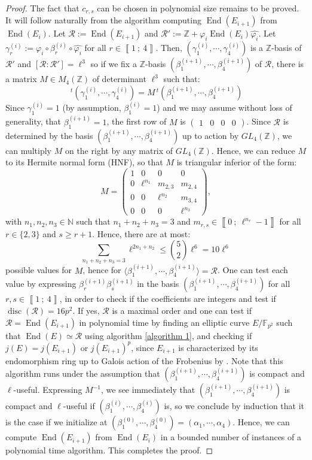 \documentclass[a4paper,10pt]{report}
\theoremstyle{definition}
\theoremstyle{plain}
\theoremstyle{definition}
\newcommand{\N}{\mathbb{N}}
\newcommand{\Z}{\mathbb{Z}}
\newcommand{\F}{\mathbb{F}}
\newcommand{\m}[1]{\mathcal{#1}}
\renewcommand{\i}[2]{\left\llbracket #1~;~#2\right\rrbracket}
\renewcommand{\(}{\left(}
\renewcommand{\)}{\right)}
\DeclareMathOperator{\End}{End}
\DeclareMathOperator{\disc}{disc}
\begin{document}
\begin{proof}
The fact that $c_{r,s}$ can be chosen in polynomial size remains to be proved. It will follow naturally from the algorithm computing $\End(E_{i+1})$ from $\End(E_i)$. Let $\m{R}:=\End(E_{i+1})$ and $\m{R}':=\Z+\varphi_i\End(E_i)\widehat{\varphi_i}$.  Let $\gamma_r^{(i)}:=\varphi_i\circ\beta_r^{(i)}\circ\widehat{\varphi_i}$ for all $r\in\i{1}{4}$. Then, $(\gamma_1^{(i)},\cdots, \gamma_4^{(i)})$ is a $\Z$-basis of $\m{R}'$ and $[\m{R}:\m{R}']=\ell^3$ so if we fix a $\Z$-basis $(\beta_1^{(i+1)},\cdots, \beta_4^{(i+1)})$ of $\m{R}$, there is a matrix $M\in M_4(\Z)$ of determinant $\ell^3$ such that:
\[\,^t (\gamma_1^{(i)},\cdots, \gamma_4^{(i)})=M \,^t(\beta_1^{(i+1)},\cdots, \beta_4^{(i+1)})\]
Since $\gamma_1^{(i)}=1$ (by assumption, $\beta_1^{(i)}=1$) and we may assume without loss of generality, that $\beta_1^{(i+1)}=1$, the first row of $M$ is $(\begin{array}{cccc}
1 & 0 & 0 & 0
\end{array})$.  Since $\m{R}$ is determined by the basis $(\beta_1^{(i+1)},\cdots, \beta_4^{(i+1)})$ up to action by $GL_4(\Z)$, we can multiply $M$ on the right by any matrix of $GL_4(\Z)$. Hence, we can reduce $M$ to its Hermite normal form (HNF), so that $M$ is triangular inferior of the form:
\[M=\(\begin{array}{cccc}
1 & 0 & 0 & 0\\
0 & \ell^{n_1} & m_{2,3} & m_{2,4}\\
0 & 0 & \ell^{n_2} & m_{3,4} \\
0 & 0 & 0 & \ell^{n_3}
\end{array}\),\]
with $n_1,n_2,n_3\in\N$ such that $n_1+n_2+n_3=3$ and $m_{r,s}\in\i{0}{\ell^{n_r}-1}$ for all $r\in\{2,3\}$ and $s\geq r+1$. Hence, there are at most:
\[\sum_{n_1+n_2+n_3=3} \ell^{2n_1+n_2}\leq \binom{5}{2}\ell^{6}=10\ell^6\]
possible values for $M$, hence for $\langle\beta_1^{(i+1)},\cdots, \beta_4^{(i+1)}\rangle=\m{R}$. One can test each value by expressing $\beta_r^{(i+1)}\beta_s^{(i+1)}$ in the basis $(\beta_1^{(i+1)},\cdots, \beta_4^{(i+1)})$ for all $r,s\in\i{1}{4}$, in order to check if the coefficients are integers and test if $\disc(\m{R})=16p^2$.  If yes, $\m{R}$ is a maximal order and one can test if $\m{R}=\End(E_{i+1})$ in polynomial time by finding an elliptic curve $E/\F_{p^2}$ such that $\End(E)\simeq\m{R}$ using algorithm \ref{algorithm 1}, and checking if $j(E)=j(E_{i+1})$ or $j(E_{i+1})^p$, since $E_{i+1}$ is characterized by its endomorphism ring up to Galois action of the Frobenius by \cite[Lemma 42.4.1]{Voight}. Note that this algorithm runs under the assumption that $(\beta_1^{(i+1)},\cdots, \beta_4^{(i+1)})$ is compact and $\ell$-useful. Expressing $M^{-1}$, we see immediately that $(\beta_1^{(i+1)},\cdots, \beta_4^{(i+1)})$ is compact and $\ell$-useful if $(\beta_1^{(i)},\cdots, \beta_4^{(i)})$ is, so we conclude by induction that it is the case if we initialize at $(\beta_1^{(0)},\cdots, \beta_4^{(0)})=(\alpha_1,\cdots,\alpha_4)$. Hence, we can compute $\End(E_{i+1})$ from $\End(E_i)$ in a bounded number of instances of a polynomial time algorithm. This completes the proof. 
\end{proof}
\end{document}
